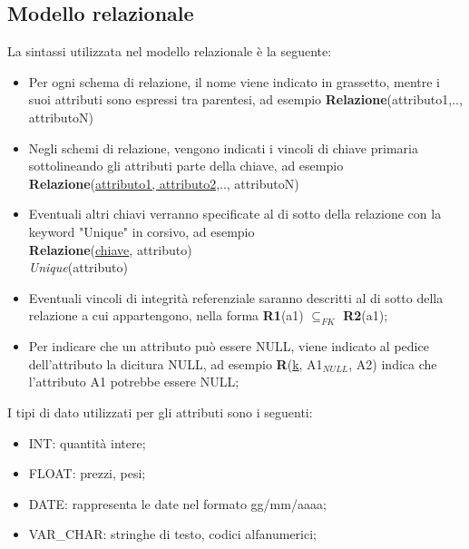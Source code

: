 \subsection{Modello relazionale}
La sintassi utilizzata nel modello relazionale è la seguente:
\begin{itemize}
  \item Per ogni schema di relazione, il nome viene indicato in grassetto, mentre i suoi attributi sono espressi tra parentesi, ad esempio \textbf{Relazione}(attributo1,.., attributoN)
  \item Negli schemi di relazione, vengono indicati i vincoli di chiave primaria sottolineando gli attributi parte della chiave, ad esempio \textbf{Relazione}(\underline{attributo1, attributo2},.., attributoN)
  \item Eventuali altri chiavi verranno specificate al di sotto della relazione con la keyword "Unique" in corsivo, ad esempio \\ \textbf{Relazione}(\underline{chiave}, attributo)\\ \textit{Unique}(attributo)
  \item Eventuali vincoli di integrità referenziale saranno descritti al di sotto della relazione a cui appartengono, nella forma \textbf{R1}(a1) $\subseteq _{FK}$ \textbf{R2}(a1);
  \item Per indicare che un attributo può essere NULL, viene indicato al pedice dell'attributo la dicitura NULL, ad esempio \textbf{R}(\underline{k}, A1$_{NULL}$, A2) indica che l'attributo A1 potrebbe essere NULL;
\end{itemize}

I tipi di dato utilizzati per gli attributi sono i seguenti:
\begin{itemize}
  \item INT: quantità intere;
  \item FLOAT: prezzi, pesi;
  \item DATE: rappresenta le date nel formato gg/mm/aaaa;
  \item VAR\_CHAR: stringhe di testo, codici alfanumerici;
\end{itemize}

